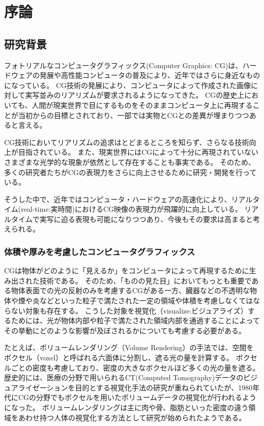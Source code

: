 \chapter{序論}
\label{CBegin}

\section{研究背景}
\label{SBackground}

フォトリアルなコンピュータグラフィックス(Computer Graphics: CG)は、ハードウェアの発展や高性能コンピュータの普及により、近年ではさらに身近なものになっている。
CG技術の発展により、コンピュータによって作成された画像に対して実写並みのリアリズムが要求されるようになってきた。
CGの歴史上においても、人間が現実世界で目にするものをそのままコンピュータ上に再現することが当初からの目標とされており、一部では実物とCGとの差異が埋まりつつあると言える。

CG技術においてリアリズムの追求はとどまるところを知らず、さらなる技術向上が目指されている。
また、現実世界にはCGによって十分に再現されていないさまざまな光学的な現象が依然として存在することも事実である。
そのため、多くの研究者たちがCGの表現力をさらに向上させるために研究・開発を行っている。

そうした中で、近年ではコンピュータ・ハードウェアの高速化により、リアルタイム(real-time:実時間)におけるCG映像の表現力が飛躍的に向上している。
リアルタイムで実写に迫る表現も可能になりつつあり\cite{jorge-jimenez2013}、今後もその要求は高まると考えられる。


\subsection{体積や厚みを考慮したコンピュータグラフィックス}
\label{SSVolumerendering}

CGは物体がどのように「見えるか」をコンピュータによって再現するために生み出された技術である。
そのため、「ものの見た目」においてもっとも重要である物体表面での光の反射のみを考慮するCGがある一方、臓器などの不透明な物体や煙や炎などといった粒子で満たされた一定の領域や体積を考慮しなくてはならない対象も存在する。
こうした対象を視覚化（visualize:ビジュアライズ）するためには、光が物体内部や粒子で満たされた領域内部を通過することによってその挙動にどのような影響が及ぼされるかについても考慮する必要がある。

たとえば、ボリュームレンダリング（Volume Rendering）の手法では、空間をボクセル（voxel）と呼ばれる六面体に分割し、遮る光の量を計算する。
ボクセルごとの密度も考慮しており、密度の大きなボクセルほど多くの光の量を遮る。
歴史的には、医療の分野で用いられるCT(Computed Tomography)データのビジュアライゼーションを目的とする視覚化手法の研究が重ねられていたが、1980年代にCGの分野でもボクセルを用いたボリュームデータの視覚化が行われるようになった\cite{cg-magic}。
ボリュームレンダリングは主に肉や骨、脂肪といった密度の違う領域をあわせ持つ人体の視覚化する方法として研究が始められたようである。


